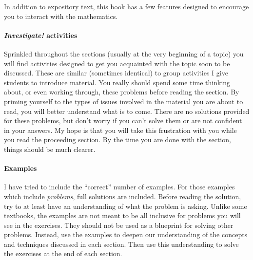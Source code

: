 \documentclass[10pt,]{book}
\theoremstyle{plain}
\theoremstyle{definition}
\theoremstyle{definition}
\theoremstyle{definition}
\numberwithin{equation}{section}
\begin{document}
  In addition to expository text, this book has a few features designed to encourage you to interact with the mathematics.
\typeout{************************************************}
\typeout{************************************************}
\paragraph[\emph{Investigate!} activities]{\emph{Investigate!} activities}\hypertarget{paragraphs-2}{}

  Sprinkled throughout the sections (usually at the very beginning of a topic) you will find activities designed to get you acquainted with the topic soon to be discussed. These are similar (sometimes identical) to group activities I give students to introduce material. You really should spend some time thinking about, or even working through, these problems before reading the section. By priming yourself to the types of issues involved in the material you are about to read, you will better understand what is to come. There are no solutions provided for these problems, but don't worry if you can't solve them or are not confident in your answers. My hope is that you will take this frustration with you while you read the proceeding section. By the time you are done with the section, things should be much clearer.
\typeout{************************************************}
\typeout{************************************************}
\paragraph[Examples]{Examples}\hypertarget{paragraphs-3}{}

  I have tried to include the ``correct'' number of examples. For those examples which include \emph{problems}, full solutions are included. Before reading the solution, try to at least have an understanding of what the problem is asking. Unlike some textbooks, the examples are not meant to be all inclusive for problems you will see in the exercises. They should not be used as a blueprint for solving other problems. Instead, use the examples to deepen our understanding of the concepts and techniques discussed in each section. Then use this understanding to solve the exercises at the end of each section.
\typeout{************************************************}
\typeout{************************************************}
\end{document}
